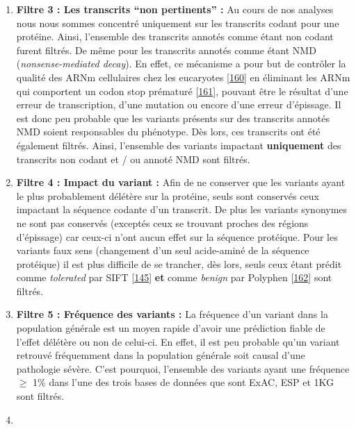 \documentclass[12pt,twoside]{reedthesis}
\theoremstyle{definition}
\theoremstyle{definition}
\theoremstyle{remark}
\begin{document}
  \begin{enumerate}
  \def\labelenumi{\arabic{enumi}.}
  \setcounter{enumi}{2}
  \item
    \textbf{Filtre 3 : Les transcrits ``non pertinents'' :} Au cours de
    nos analyses nous nous sommes concentré uniquement sur les transcrits
    codant pour une protéine. Ainsi, l'ensemble des transcrits annotés
    comme étant non codant furent filtrés. De même pour les transcrits
    annotés comme étant NMD (\emph{nonsense-mediated decay}). En effet, ce
    mécanisme a pour but de contrôler la qualité des ARNm cellulaires chez
    les eucaryotes {[}\protect\hyperlink{ref-Chang2007}{160}{]} en
    éliminant les ARNm qui comportent un codon stop prématuré
    {[}\protect\hyperlink{ref-Baker2004}{161}{]}, pouvant être le résultat
    d'une erreur de transcription, d'une mutation ou encore d'une erreur
    d'épissage. Il est donc peu probable que les variants présents sur des
    transcrits annotés NMD soient responsables du phénotype. Dès lors, ces
    transcrits ont été également filtrés. Ainsi, l'ensemble des variants
    impactant \textbf{uniquement} des transcrits non codant et / ou annoté
    NMD sont filtrés.
  \item
    \textbf{Filtre 4 : Impact du variant :} Afin de ne conserver que les
    variants ayant le plus probablement délétère sur la protéine, seuls
    sont conservés ceux impactant la séquence codante d'un transcrit. De
    plus les variants synonymes ne sont pas conservés (exceptés ceux se
    trouvant proches des régions d'épissage) car ceux-ci n'ont aucun effet
    sur la séquence protéique. Pour les variants faux sens (changement
    d'un seul acide-aminé de la séquence protéique) il est plus difficile
    de se trancher, dès lors, seuls ceux étant prédit comme
    \emph{tolerated} par SIFT {[}\protect\hyperlink{ref-Kumar2009}{145}{]}
    \textbf{et} comme \emph{benign} par Polyphen
    {[}\protect\hyperlink{ref-Adzhubei2010}{162}{]} sont filtrés.
  \item
    \textbf{Filtre 5 : Fréquence des variants :} La fréquence d'un variant
    dans la population générale est un moyen rapide d'avoir une prédiction
    fiable de l'effet délétère ou non de celui-ci. En effet, il est peu
    probable qu'un variant retrouvé fréquemment dans la population
    générale soit causal d'une pathologie sévère. C'est pourquoi,
    l'ensemble des variants ayant une fréquence \(\ge\) 1\% dans l'une des
    trois bases de données que sont ExAC, ESP et 1KG sont filtrés.
  \item

\end{enumerate}
\end{document}
